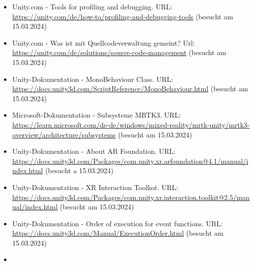 \begin{itemize}
    \item Unity.com - Tools for profiling and debugging. URL: \url{https://unity.com/de/how-to/profiling-and-debugging-tools} (besucht am 15.03.2024)
    \item Unity.com - Was ist mit Quellcodeverwaltung gemeint? Url: \url{https://unity.com/de/solutions/source-code-management} (besucht am 15.03.2024)
    \item Unity-Dokumentation - MonoBehaviour Class. URL: \url{https://docs.unity3d.com/ScriptReference/MonoBehaviour.html} (besucht am 15.03.2024)
    \item Microsoft-Dokumentation - Subsysteme MRTK3. URL: \url{https://learn.microsoft.com/de-de/windows/mixed-reality/mrtk-unity/mrtk3-overview/architecture/subsystems} (besucht am 15.03.2024)
    \item Unity-Dokumentation - About AR Foundation. URL: \url{https://docs.unity3d.com/Packages/com.unity.xr.arfoundation@4.1/manual/index.html} (besucht a 15.03.2024)
    \item Unity-Dokumentation - XR Interaction Toolkot. URL: \url{https://docs.unity3d.com/Packages/com.unity.xr.interaction.toolkit@2.5/manual/index.html} (besucht am 15.03.2024)
    \item Unity-Dokumentation - Order of execution for event functions. URL: \url{https://docs.unity3d.com/Manual/ExecutionOrder.html} (besucht am 15.03.2024)
\item \end{itemize}


